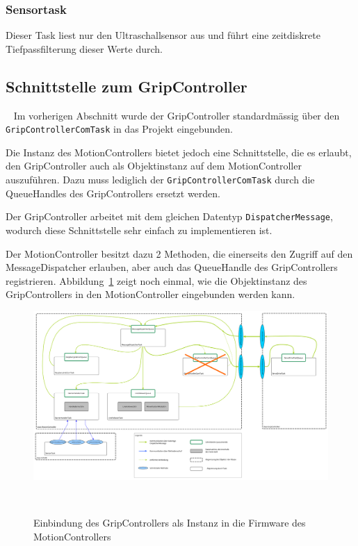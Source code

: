 \documentclass[main.tex]{subfiles} %
\begin{document}
\subsubsection*{Sensortask}
Dieser Task liest nur den Ultraschallsensor aus und führt eine zeitdiskrete Tiefpassfilterung dieser Werte durch.

\subsection{Schnittstelle zum GripController}~\label{apdx:ComGripControllerMotionController}
Im vorherigen Abschnitt wurde der GripController standardmässig über den
\texttt{GripControllerComTask} in das Projekt eingebunden.

Die Instanz des MotionControllers bietet jedoch eine Schnittstelle, die es
erlaubt, den GripController auch als Objektinstanz auf dem MotionController
auszuführen. Dazu muss lediglich der \texttt{GripControllerComTask} durch die
QueueHandles des GripControllers ersetzt werden.

Der GripController arbeitet mit dem gleichen Datentyp
\texttt{DispatcherMessage}, wodurch diese Schnittstelle sehr einfach zu
implementieren ist.

Der MotionController besitzt dazu 2 Methoden, die einerseits den Zugriff auf
den MessageDispatcher erlauben, aber auch das QueueHandle des GripControllers
registrieren. Abbildung~\ref{fig:Einbindung_GripController_als_Instanz} zeigt
noch einmal, wie die Objektinstanz des GripControllers in den MotionController
eingebunden werden kann.

\begin{figure}[H]
    \centering
    \includegraphics[width=1\linewidth]{./fig_Firmware_MotionController/Einbindung_GripControllerQueues.pdf}
    \caption{Einbindung des GripControllers als Instanz in die Firmware des MotionControllers}~\label{fig:Einbindung_GripController_als_Instanz}
\end{figure}
\end{document}

